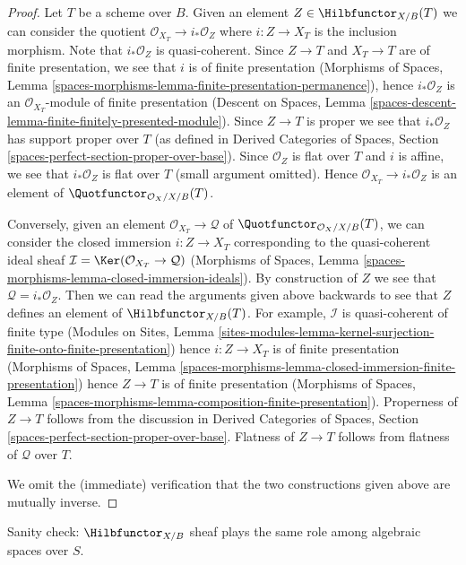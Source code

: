 \begin{proof}
Let $T$ be a scheme over $B$. Given an element
$Z \in \Hilbfunctor_{X/B}(T)$ we can consider the
quotient $\mathcal{O}_{X_T} \to i_*\mathcal{O}_Z$
where $i : Z \to X_T$ is the inclusion morphism.
Note that $i_*\mathcal{O}_Z$ is quasi-coherent.
Since $Z \to T$ and $X_T \to T$ are of finite presentation,
we see that $i$ is of finite presentation (Morphisms of Spaces, Lemma
\ref{spaces-morphisms-lemma-finite-presentation-permanence}), hence
$i_*\mathcal{O}_Z$ is an $\mathcal{O}_{X_T}$-module of
finite presentation (Descent on Spaces, Lemma
\ref{spaces-descent-lemma-finite-finitely-presented-module}).
Since $Z \to T$ is proper we see that $i_*\mathcal{O}_Z$
has support proper over $T$ (as defined in
Derived Categories of Spaces, Section
\ref{spaces-perfect-section-proper-over-base}).
Since $\mathcal{O}_Z$ is flat
over $T$ and $i$ is affine, we see that $i_*\mathcal{O}_Z$
is flat over $T$ (small argument omitted). Hence
$\mathcal{O}_{X_T} \to i_*\mathcal{O}_Z$
is an element of $\Quotfunctor_{\mathcal{O}_X/X/B}(T)$.

\medskip\noindent
Conversely, given an element $\mathcal{O}_{X_T} \to \mathcal{Q}$
of $\Quotfunctor_{\mathcal{O}_X/X/B}(T)$, we can consider
the closed immersion $i : Z \to X_T$ corresponding to
the quasi-coherent ideal sheaf
$\mathcal{I} = \Ker(\mathcal{O}_{X_T} \to \mathcal{Q})$
(Morphisms of Spaces, Lemma
\ref{spaces-morphisms-lemma-closed-immersion-ideals}).
By construction of $Z$ we see that $\mathcal{Q} = i_*\mathcal{O}_Z$.
Then we can read the arguments given above backwards to see
that $Z$ defines an element of $\Hilbfunctor_{X/B}(T)$.
For example, $\mathcal{I}$ is quasi-coherent of finite type
(Modules on Sites, Lemma
\ref{sites-modules-lemma-kernel-surjection-finite-onto-finite-presentation})
hence $i : Z \to X_T$ is of finite presentation
(Morphisms of Spaces, Lemma
\ref{spaces-morphisms-lemma-closed-immersion-finite-presentation})
hence $Z \to T$ is of finite presentation
(Morphisms of Spaces, Lemma
\ref{spaces-morphisms-lemma-composition-finite-presentation}).
Properness of $Z \to T$ follows from the discussion in
Derived Categories of Spaces, Section
\ref{spaces-perfect-section-proper-over-base}.
Flatness of $Z \to T$ follows from flatness of $\mathcal{Q}$ over $T$.

\medskip\noindent
We omit the (immediate) verification that the two constructions given
above are mutually inverse.
\end{proof}

\noindent
Sanity check: $\Hilbfunctor_{X/B}$
sheaf plays the same role among algebraic spaces over $S$.

